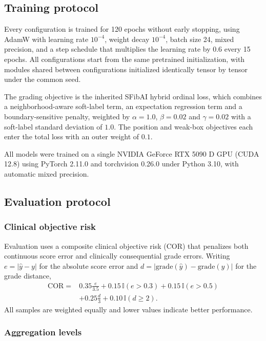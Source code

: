 \subsection{Training protocol}

Every configuration is trained for 120 epochs without early stopping, using
AdamW with learning rate $10^{-4}$, weight decay $10^{-4}$, batch size 24, mixed
precision, and a step schedule that multiplies the learning rate by $0.6$ every
15 epochs. All configurations start from the same pretrained initialization,
with modules shared between configurations initialized identically tensor by
tensor under the common seed.

The grading objective is the inherited SFibAI hybrid ordinal loss, which
combines a neighborhood-aware soft-label term, an expectation regression term
and a boundary-sensitive penalty, weighted by $\alpha=1.0$, $\beta=0.02$ and
$\gamma=0.02$ with a soft-label standard deviation of $1.0$. The position and
weak-box objectives each enter the total loss with an outer weight of $0.1$.

All models were trained on a single NVIDIA GeForce RTX 5090 D GPU (CUDA 12.8)
using PyTorch 2.11.0 and torchvision 0.26.0 under Python 3.10, with automatic
mixed precision.

\subsection{Evaluation protocol}

\subsubsection{Clinical objective risk}

Evaluation uses a composite clinical objective risk (COR) that penalizes both
continuous score error and clinically consequential grade errors. Writing
$e = |\hat{y}-y|$ for the absolute score error and
$d = |\mathrm{grade}(\hat{y})-\mathrm{grade}(y)|$ for the grade distance,
\begin{align}
\mathrm{COR} ={}& 0.35\frac{e}{3.5} + 0.15\,\mathbb{I}(e>0.3) + 0.15\,\mathbb{I}(e>0.5) \nonumber\\
             & + 0.25\frac{d}{3} + 0.10\,\mathbb{I}(d\geq2).
\label{eq:cor}
\end{align}
All samples are weighted equally and lower values indicate better performance.

\subsubsection{Aggregation levels}


